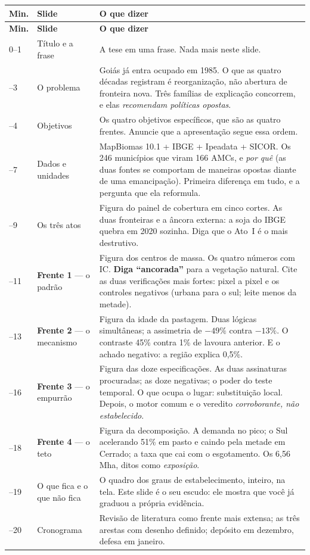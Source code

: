 \vspace{10pt}
\begin{longtable}{@{}p{0.9cm}p{4.5cm}p{9.2cm}@{}}
\toprule
\textbf{Min.} & \textbf{Slide} & \textbf{O que dizer} \\
\midrule
\endfirsthead
\toprule
\textbf{Min.} & \textbf{Slide} & \textbf{O que dizer} \\
\midrule
\endhead
0--1 & Título e a frase & A tese em uma frase. Nada mais neste slide. \\
\addlinespace
1--3 & O problema & Goiás já entra ocupado em 1985. O que as quatro décadas
registram é reorganização, não abertura de fronteira nova. Três famílias de
explicação concorrem, e elas \emph{recomendam políticas opostas}. \\
\addlinespace
3--4 & Objetivos & Os quatro objetivos específicos, que são as quatro frentes.
Anuncie que a apresentação segue essa ordem. \\
\addlinespace
4--7 & Dados e unidades & MapBiomas 10.1 + IBGE + Ipeadata + SICOR. Os 246
municípios que viram 166 AMCs, e \emph{por quê} (as duas fontes se comportam de
maneiras opostas diante de uma emancipação). Primeira diferença em tudo, e a
pergunta que ela reformula. \\
\addlinespace
7--9 & Os três atos & Figura do painel de cobertura em cinco cortes. As duas
fronteiras e a âncora externa: a soja do IBGE quebra em 2020 sozinha. Diga que
o Ato~I é o mais destrutivo. \\
\addlinespace
9--11 & \textbf{Frente 1} --- o padrão & Figura dos centros de massa. Os quatro
números com IC. \textbf{Diga ``ancorada''} para a vegetação natural. Cite as
duas verificações mais fortes: pixel a pixel e os controles negativos (urbana
para o sul; leite menos da metade). \\
\addlinespace
11--13 & \textbf{Frente 2} --- o mecanismo & Figura da idade da pastagem. Duas
lógicas simultâneas; a assimetria de $-49\%$ contra $-13\%$. O contraste 45\%
contra 1\% de lavoura anterior. E o achado negativo: a região explica 0,5\%. \\
\addlinespace
13--16 & \textbf{Frente 3} --- o empurrão & Figura das doze especificações. As
duas assinaturas procuradas; as doze negativas; o poder do teste temporal. O
que ocupa o lugar: substituição local. Depois, o motor comum e o veredito
\emph{corroborante, não estabelecido}. \\
\addlinespace
16--18 & \textbf{Frente 4} --- o teto & Figura da decomposição. A demanda no
pico; o Sul acelerando 51\% em pasto e caindo pela metade em Cerrado; a taxa
que cai com o esgotamento. Os 6,56 Mha, ditos como \emph{exposição}. \\
\addlinespace
18--19 & O que fica e o que não fica & O quadro dos graus de estabelecimento,
inteiro, na tela. Este slide é o seu escudo: ele mostra que você já graduou a
própria evidência. \\
\addlinespace
19--20 & Cronograma & Revisão de literatura como frente mais extensa; as três
arestas com desenho definido; depósito em dezembro, defesa em janeiro. \\
\bottomrule
\end{longtable}


